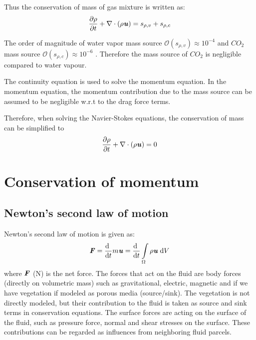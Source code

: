 Thus the conservation of mass of gas mixture is written as:
\begin{equation}
\frac{{\partial {\rho}}}{{\partial t}} + \nabla  \cdot \left( {{\rho }{\textbf{\textit{u}}}} \right) = s_{\rho,v} + s_{\rho,c}
\end{equation}

\begin{assumption}
The order of magnitude of water vapor mass source $\mathcal{O}\left(s_{\rho,v}\right)\approx10^{-4}$ and $CO_2$ mass source $\mathcal{O}\left(s_{\rho,c}\right)\approx10^{-6}$ \citep{Hiraoka2005}. Therefore the mass source of $CO_2$ is negligible compared to water vapour.
\end{assumption}

\begin{assumption}
The continuity equation is used to solve the momentum equation. In the momentum equation, the momentum contribution due to the mass source can be assumed to be negligible w.r.t to the drag force terms.
\end{assumption}

Therefore, when solving the Navier-Stokes equations, the conservation of mass can be simplified to
\begin{equation}
\frac{{\partial {\rho}}}{{\partial t}} + \nabla  \cdot \left( {{\rho }{\textbf{\textit{u}}}}\right) = 0
\end{equation}

\section{Conservation of momentum}
\label{sec:conservationofmomentum}

\subsection{Newton's second law of motion}
Newton's second law of motion is given as:
\begin{equation}
{\textbf{\textit{F}}} = \frac{\mathrm{d}~}{{\mathrm{d}t}}m{\textbf{\textit{u}}}=\frac{\mathrm{d}~}{{\mathrm{d}t}} \int \limits_\Omega  \rho {\textbf{\textit{u}}}\;\mathrm{d}V
\end{equation}
where $\textbf{\textit{F}}$ (N) is the net force. The forces that act on the fluid are body forces (directly on volumetric mass) such as gravitational, electric, magnetic and if we have vegetation if modeled as porous media (source/sink). The vegetation is not directly modeled, but their contribution to the fluid is taken as source and sink terms in conservation equations. The surface forces are acting on the surface of the fluid, such as pressure force, normal and shear stresses on the surface. These contributions can be regarded as influences from neighboring fluid parcels.

